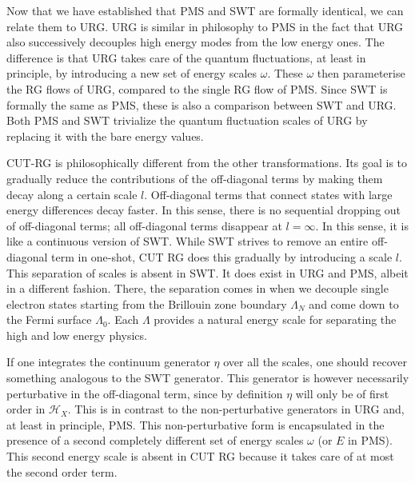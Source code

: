 Now that we have established that PMS and SWT are formally identical, we can relate them to URG. URG is similar in philosophy to PMS in the fact that URG also successively decouples high energy modes from the low energy ones. The difference is that URG takes care of the quantum fluctuations, at least in principle, by introducing a new set of energy scales \(\omega\). These \(\omega\) then parameterise the RG flows of URG, compared to the single RG flow of PMS. Since SWT is formally the same as PMS, these is also a comparison between SWT and URG. Both PMS and SWT trivialize the quantum fluctuation scales of URG by replacing it with the bare energy values.

CUT-RG is philosophically different from the other transformations. Its goal is to gradually reduce the contributions of the off-diagonal terms by making them decay along a certain scale \(l\). Off-diagonal terms that connect states with large energy differences decay faster. In this sense, there is no sequential dropping out of off-diagonal terms; all off-diagonal terms disappear at \(l=\infty\). In this sense, it is like a continuous version of SWT. While SWT strives to remove an entire off-diagonal term in one-shot, CUT RG does this gradually by introducing a scale \(l\). This separation of scales is absent in SWT. It does exist in URG and PMS, albeit in a different fashion. There, the separation comes in when we decouple single electron states starting from the Brillouin zone boundary \(\Lambda_N\) and come down to the Fermi surface \(\Lambda_0\). Each \(\Lambda\) provides a natural energy scale for separating the high and low energy physics.

If one integrates the continuum generator \(\eta\) over all the scales, one should recover something analogous to the SWT generator. This generator is however necessarily perturbative in the off-diagonal term, since by definition \(\eta\) will only be of first order in \(\mathcal{H}_X\). This is in contrast to the non-perturbative generators in URG and, at least in principle, PMS. This non-perturbative form is encapsulated in the presence of a second completely different set of energy scales \(\omega\) (or \(E\) in PMS). This second energy scale is absent in CUT RG because it takes care of at most the second order term.

